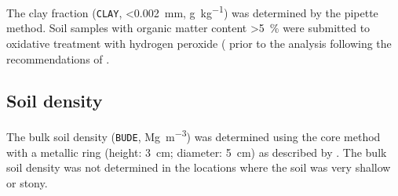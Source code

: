 
The clay fraction (\texttt{CLAY}, \SI{<0.002}{\milli\metre}, \si{\gram\per\kilo\gram}) was determined by the 
pipette method. Soil samples with organic matter content \SI{>5}{\percent} were submitted to oxidative 
treatment with hydrogen peroxide ( prior to the analysis following the recommendations of
.

%



\tocless\subsection{Soil density}

The bulk soil density (\texttt{BUDE}, \si{\mega\gram\per\cubic\metre}) was determined using the core method with a 
metallic ring (height: \SI{3}{\centi\metre}; diameter: \SI{5}{\centi\metre}) as described by 
. The bulk soil density was not determined in the locations where the soil was very 
shallow or stony.

